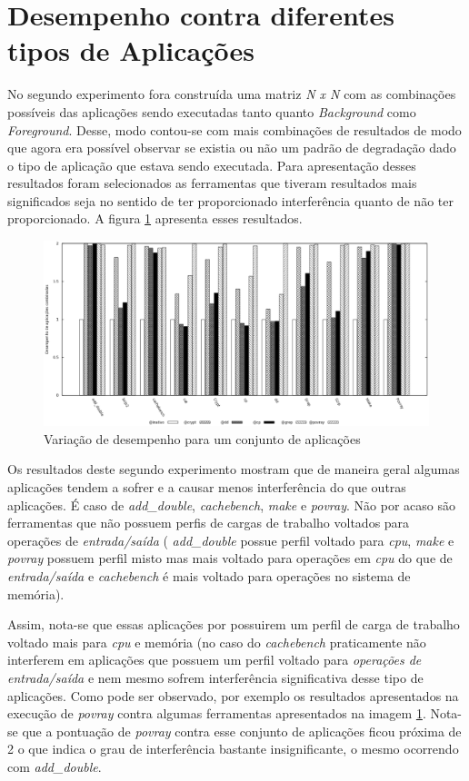 \section{Desempenho contra diferentes tipos de Aplicações}
No segundo experimento fora construída uma matriz  \textit{N x N} com as combinações possíveis das aplicações sendo executadas tanto quanto \textit{Background } como \textit{Foreground}. Desse, modo contou-se com mais combinações de resultados de modo que agora era possível observar se existia ou não um padrão de degradação dado o tipo de aplicação que estava sendo executada. Para apresentação desses resultados foram selecionados as ferramentas que tiveram resultados mais significados seja no sentido de ter proporcionado interferência quanto de não ter proporcionado. A figura \ref{second_experiment} apresenta esses resultados.

\begin{figure}[!h]
\centering
\includegraphics [keepaspectratio=true,scale=0.5]{graficos/exp2.eps}
\caption{Variação de desempenho para um conjunto de aplicações}
\label{second_experiment}
\end{figure} 

Os resultados deste segundo experimento mostram que de maneira geral algumas aplicações tendem a sofrer e a causar menos interferência do que outras aplicações. É caso de \textit{add\_double}, \textit{cachebench}, \textit{make} e \textit{povray}. Não por acaso são ferramentas que não possuem perfis de cargas de trabalho voltados para operações de \textit{entrada/saída} ( \textit{add\_double} possue perfil voltado para \textit{cpu}, \textit{make} e \textit{povray} possuem perfil misto mas mais voltado para operações em \textit{cpu} do que de \textit{entrada/saída} e \textit{cachebench} é mais voltado para operações no sistema de memória). 

Assim, nota-se que essas aplicações por possuirem um perfil de carga de trabalho voltado mais para \textit{cpu} e memória (no caso do \textit{cachebench} praticamente não interferem em aplicações que possuem um perfil voltado para \textit{operações de entrada/saída} e nem mesmo sofrem interferência significativa desse tipo de aplicações. Como pode ser observado, por exemplo os resultados apresentados na execução de \textit{povray} contra algumas ferramentas apresentados na imagem \ref{second_experiment}. Nota-se que a pontuação de \textit{povray} contra esse conjunto de aplicações ficou próxima de 2 o que indica o grau de interferência bastante insignificante, o mesmo ocorrendo com \textit{add\_double}.

